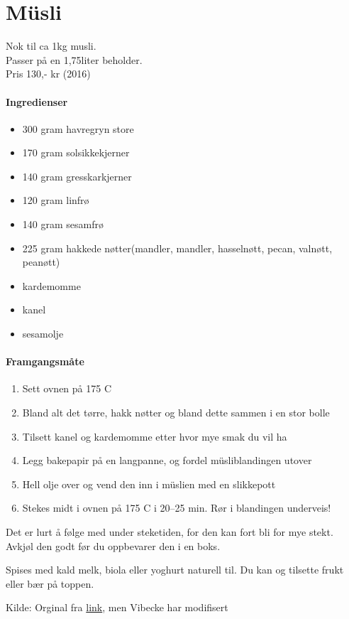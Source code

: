 \section{﻿Müsli}
Nok til ca 1kg musli.\\ Passer på en 1,75liter beholder.\\
Pris 130,- kr (2016)

\paragraph{Ingredienser}
\begin{itemize}[noitemsep]
	\item 300 gram havregryn store
	\item 170 gram solsikkekjerner
	\item 140 gram gresskarkjerner
	\item 120 gram linfrø
	\item 140 gram sesamfrø
	\item 225 gram hakkede nøtter(mandler, mandler, hasselnøtt, pecan, valnøtt, peanøtt)
	\item kardemomme
	\item kanel
	\item sesamolje
\end{itemize}

\paragraph{Framgangsmåte}
\begin{enumerate}[noitemsep]
	\item	Sett ovnen på 175 \degree C
	\item	Bland alt det tørre, hakk nøtter og bland dette sammen i en stor bolle
	\item	Tilsett kanel og kardemomme etter hvor mye smak du vil ha
	\item	Legg bakepapir på en langpanne, og fordel müsliblandingen utover
	\item	Hell olje over og vend den inn i müslien med en slikkepott
	\item	Stekes midt i ovnen på 175 \degree C i 20--25 min. Rør i blandingen underveis!
\end{enumerate}


Det er lurt å følge med under steketiden, for den kan fort bli for mye stekt.
Avkjøl den godt før du oppbevarer den i en boks.

Spises med kald melk, biola eller yoghurt naturell til. Du kan og tilsette frukt eller bær på toppen.

Kilde: Orginal fra \href{http://www.karolinegrovdal.no/?p=305}{link}, men Vibecke har modifisert
